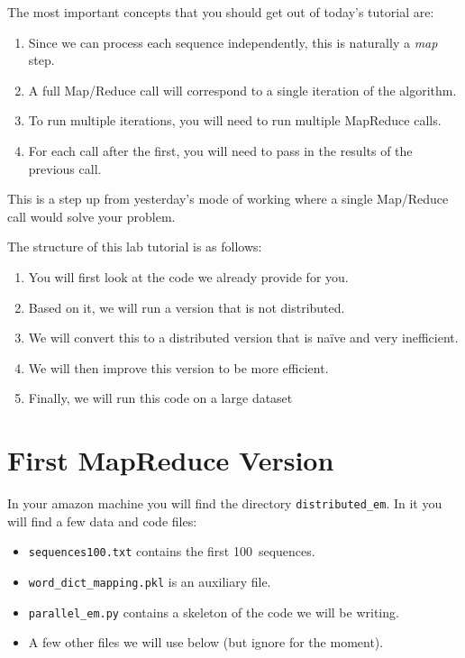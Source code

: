 The most important concepts that you should get out of today's tutorial are:

\begin{enumerate}
\item Since we can process each sequence independently, this is naturally a
\emph{map} step.
\item A full Map/Reduce call will correspond to a single iteration of the
algorithm.
\item To run multiple iterations, you will need to run multiple MapReduce
calls.
\item For each call after the first, you will need to pass in the results of
the previous call.
\end{enumerate}

This is a step up from yesterday's mode of working where a single Map/Reduce
call would solve your problem.

The structure of this lab tutorial is as follows:

\begin{enumerate}
\item You will first look at the code we already provide for you.
\item Based on it, we will run a version that is not distributed.
\item We will convert this to a distributed version that is naïve and very inefficient.
\item We will then improve this version to be more efficient.
\item Finally, we will run this code on a large dataset
\end{enumerate}

\section{First MapReduce Version}

In your amazon machine you will find the directory \texttt{distributed\_em}. In
it you will find a few data and code files:

\begin{itemize}
\item \verb+sequences100.txt+ contains the first 100~sequences.
\item \verb+word_dict_mapping.pkl+ is an auxiliary file.
\item \verb+parallel_em.py+ contains a skeleton of the code we will be writing.
\item A few other files we will use below (but ignore for the moment).
\end{itemize}

